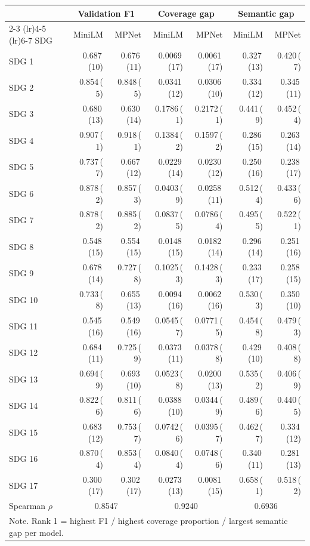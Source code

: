 \small
\begin{tabular}{lrrrrrr}
\toprule
& \multicolumn{2}{c}{Validation F1} & \multicolumn{2}{c}{Coverage gap} & \multicolumn{2}{c}{Semantic gap} \\
\cmidrule(lr){2-3} \cmidrule(lr){4-5} \cmidrule(lr){6-7}
SDG & MiniLM & MPNet & MiniLM & MPNet & MiniLM & MPNet \\
\midrule
SDG  1 & 0.687\,(10) & 0.676\,(11) & 0.0069\,(17) & 0.0061\,(17) & 0.327\,(13) & 0.420\,( 7) \\
SDG  2 & 0.854\,( 5) & 0.848\,( 5) & 0.0341\,(12) & 0.0306\,(10) & 0.334\,(12) & 0.345\,(11) \\
SDG  3 & 0.680\,(13) & 0.630\,(14) & 0.1786\,( 1) & 0.2172\,( 1) & 0.441\,( 9) & 0.452\,( 4) \\
SDG  4 & 0.907\,( 1) & 0.918\,( 1) & 0.1384\,( 2) & 0.1597\,( 2) & 0.286\,(15) & 0.263\,(14) \\
SDG  5 & 0.737\,( 7) & 0.667\,(12) & 0.0229\,(14) & 0.0230\,(12) & 0.250\,(16) & 0.238\,(17) \\
SDG  6 & 0.878\,( 2) & 0.857\,( 3) & 0.0403\,( 9) & 0.0258\,(11) & 0.512\,( 4) & 0.433\,( 6) \\
SDG  7 & 0.878\,( 2) & 0.885\,( 2) & 0.0837\,( 5) & 0.0786\,( 4) & 0.495\,( 5) & 0.522\,( 1) \\
SDG  8 & 0.548\,(15) & 0.554\,(15) & 0.0148\,(15) & 0.0182\,(14) & 0.296\,(14) & 0.251\,(16) \\
SDG  9 & 0.678\,(14) & 0.727\,( 8) & 0.1025\,( 3) & 0.1428\,( 3) & 0.233\,(17) & 0.258\,(15) \\
SDG 10 & 0.733\,( 8) & 0.655\,(13) & 0.0094\,(16) & 0.0062\,(16) & 0.530\,( 3) & 0.350\,(10) \\
SDG 11 & 0.545\,(16) & 0.549\,(16) & 0.0545\,( 7) & 0.0771\,( 5) & 0.454\,( 8) & 0.479\,( 3) \\
SDG 12 & 0.684\,(11) & 0.725\,( 9) & 0.0373\,(11) & 0.0378\,( 8) & 0.429\,(10) & 0.408\,( 8) \\
SDG 13 & 0.694\,( 9) & 0.693\,(10) & 0.0523\,( 8) & 0.0200\,(13) & 0.535\,( 2) & 0.406\,( 9) \\
SDG 14 & 0.822\,( 6) & 0.811\,( 6) & 0.0388\,(10) & 0.0344\,( 9) & 0.489\,( 6) & 0.440\,( 5) \\
SDG 15 & 0.683\,(12) & 0.753\,( 7) & 0.0742\,( 6) & 0.0395\,( 7) & 0.462\,( 7) & 0.334\,(12) \\
SDG 16 & 0.870\,( 4) & 0.853\,( 4) & 0.0840\,( 4) & 0.0748\,( 6) & 0.340\,(11) & 0.281\,(13) \\
SDG 17 & 0.300\,(17) & 0.302\,(17) & 0.0273\,(13) & 0.0081\,(15) & 0.658\,( 1) & 0.518\,( 2) \\
\midrule
Spearman $\rho$ & \multicolumn{2}{c}{0.8547} & \multicolumn{2}{c}{0.9240} & \multicolumn{2}{c}{0.6936} \\
\multicolumn{7}{l}{\footnotesize Note. Rank 1 = highest F1 / highest coverage proportion / largest semantic gap per model.}\\
\bottomrule
\end{tabular}
